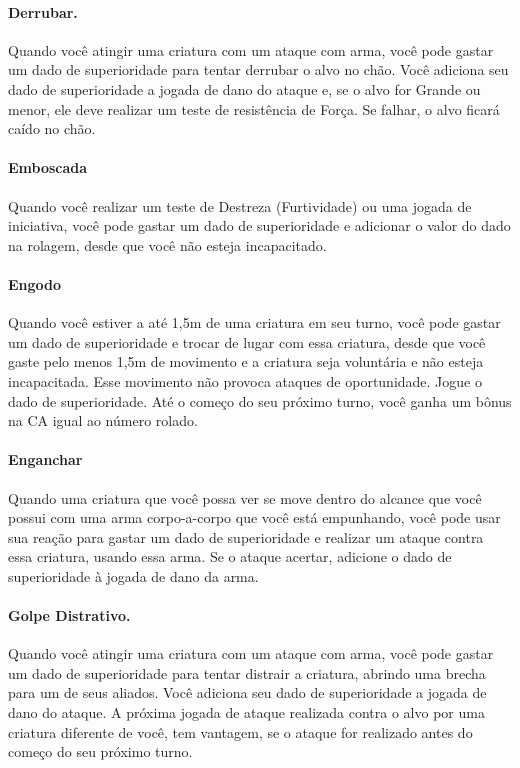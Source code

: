\documentclass{RPG_Adventure}[2021/10/20]
\begin{document}
\paragraph{Derrubar.} Quando você atingir uma criatura com um ataque com arma,
você pode gastar um dado de superioridade para tentar derrubar o alvo no chão.
Você adiciona seu dado de superioridade a jogada de dano do ataque e, se o alvo
for Grande ou menor, ele deve realizar um teste de resistência de Força. Se
falhar, o alvo ficará caído no chão.

\paragraph{Emboscada} Quando você realizar um teste de Destreza (Furtividade) ou
uma jogada de iniciativa, você pode gastar um dado de superioridade e adicionar
o valor do dado na rolagem, desde que você não esteja incapacitado.

\paragraph{Engodo} Quando você estiver a até 1,5m de uma criatura em seu turno,
você pode gastar um dado de superioridade e trocar de lugar com essa criatura,
desde que você gaste pelo menos 1,5m de movimento e a criatura seja voluntária e
não esteja incapacitada. Esse movimento não provoca ataques de oportunidade.
Jogue o dado de superioridade. Até o começo do seu próximo turno, você ganha um
bônus na CA igual ao número rolado.

\paragraph{Enganchar} Quando uma criatura que você possa ver se move dentro do
alcance que você possui com uma arma corpo-a-corpo que você está empunhando,
você pode usar sua reação para gastar um dado de superioridade e realizar um
ataque contra essa criatura, usando essa arma. Se o ataque acertar, adicione o
dado de superioridade à jogada de dano da arma.

\paragraph{Golpe Distrativo.} Quando você atingir uma criatura com um ataque com
arma, você pode gastar um dado de superioridade para tentar distrair a criatura,
abrindo uma brecha para um de seus aliados. Você adiciona seu dado de
superioridade a jogada de dano do ataque. A próxima jogada de ataque realizada
contra o alvo por uma criatura diferente de você, tem vantagem, se o ataque for
realizado antes do começo do seu próximo turno.
\end{document}
